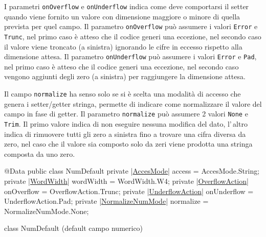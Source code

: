 \documentclass[a4paper,10pt]{report}
\newif\ifesource
\newenvironment{elisting}[1][!htb]
  {\captionsetup{aboveskip=0pt}\begin{listing}[#1]}
  {\end{listing}%
}
\begin{document}
I parametri \verb!onOverflow! e \verb!onUnderflow! indica come deve comportarsi
il setter quando viene fornito un valore con dimensione maggiore o minore di
quella prevista per quel campo.
Il parametro \verb!onOverflow! può assumere i valori \verb!Error! e 
\verb!Trunc!, nel primo caso è atteso che il codice generi una eccezione,
nel secondo caso il valore viene troncato (a sinistra) ignorando le cifre in
eccesso rispetto alla dimensione attesa.
Il parametro \verb!onUnderflow! può assumere i valori \verb!Error! e \verb!Pad!,
nel primo caso è atteso che il codice generi una eccezione, nel secondo caso
vengono aggiunti degli zero (a sinistra) per raggiungere la dimensione attesa.

Il campo \verb!normalize! ha senso solo se si è scelta una modalità di
accesso che genera i setter/getter stringa, permette di indicare come 
normalizzare il valore del campo in fase di getter.
Il parametro \verb!normalize! può assumere 2 valori \verb!None! e \verb!Trim!. 
Il primo valore indica di non eseguire nessuna modifica del dato,
l'\,altro indica di rimuovere tutti gli zero a sinistra fino a trovare
una cifra diversa da zero, nel caso che il valore sia composto solo da
zeri viene prodotta una stringa composta da uno zero.

\ifesource
\begin{figure*}[!htb]
\begin{lstlisting}[language=java, 
caption=class NumDefault (default campo numerico), 
label=lst:NumDefault]
@Data
public class NumDefault {
    private (*\hyperref[lst:AccesMode]{AccesMode}*) access = AccesMode.String;
    private (*\hyperref[lst:WordWidth]{WordWidth}*) wordWidth = WordWidth.W4;
    private (*\hyperref[lst:OverflowAction]{OverflowAction}*) onOverflow = OverflowAction.Trunc;
    private (*\hyperref[lst:UnderflowAction]{UnderflowAction}*) onUnderflow = UnderflowAction.Pad;
    private (*\hyperref[lst:NormalizeNumMode]{NormalizeNumMode}*) normalize = NormalizeNumMode.None;
}
\end{lstlisting}\index{NumDefault}
\end{figure*}
\else
\begin{elisting}
\begin{javacode}
@Data
public class NumDefault {
    private |\hyperref[lst:AccesMode]{AccesMode}| access = AccesMode.String;
    private |\hyperref[lst:WordWidth]{WordWidth}| wordWidth = WordWidth.W4;
    private |\hyperref[lst:OverflowAction]{OverflowAction}| onOverflow = OverflowAction.Trunc;
    private |\hyperref[lst:UnderflowAction]{UnderflowAction}| onUnderflow = UnderflowAction.Pad;
    private |\hyperref[lst:NormalizeNumMode]{NormalizeNumMode}| normalize = NormalizeNumMode.None;
}
\end{javacode}
\caption{class NumDefault (default campo numerico)}
\label{lst:NumDefault}
\end{elisting}
\fi
\end{document}
